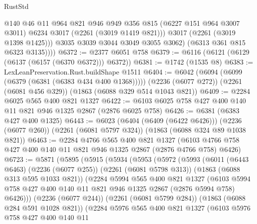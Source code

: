 \begin{lexlean}{RustStd}
\begin{coremodule}
                @140
                @46
                @11
                @964
                @821
                @946
                @949
                @356
                @815
                (@6227 @151 @964 @3007 @3011)
                @6234
                @3017
                (@2261 (@3019 @1419 @821)))
              @3017
              (@2261 (@3019 @1398 @1425)))
            @3035
            @3039
            @3044
            @3049
            @3055
            @3062)
          (@6313 @361 @815 @6323 @3135))))
@6372 := @2377 @6051 @758
@6379 := @6116 (@6121 (@6129 (@6137 (@6157 (@6370 @6372))) @6372))
@6381 := @1742 (@1535 @8)
@6383 := LexLeanPreservation.Rust.buildShape @1511
@6404 := @6042
    (@6094 (@6099 (@6379 (@6381 (@6383 @434 @400 @1368)))))
    (@2236 (@6077 @272))
    (@2261 (@6081 @456 @329))
    (@1863 (@6088 @329 @514 @1043 @821))
@6409 := @2284 @6025 @565 @400 @821 @1327
@6422 := @6103 @6025 @758 @427 @400 @140 @11 @821 @946 @1325 @2867 (@2876 @6025 @758)
@6426 := @6381 (@6383 @427 @400 @1325)
@6443 := @6023
    (@6404 (@6409 (@6422 @6426)))
    (@2236 (@6077 @260))
    (@2261 (@6081 @5797 @324))
    (@1863 (@6088 @324 @89 @1038 @821))
@6463 := @2284
    @4766
    @565
    @400
    @821
    @1327
    (@6103 @4766 @758 @427 @400 @140 @11 @821 @946 @1325 @2867 (@2876 @4766 @758) @6426)
@6723 := @5871
    (@5895
      (@5915
        (@5934
          (@5953
            (@5972
              (@5993
                (@6011
                  (@6443 @6463)
                  (@2236 (@6077 @255))
                  (@2261 (@6081 @5798 @313))
                  (@1863 (@6088 @313 @595 @1033 @821))
                  (@2284
                    @5994
                    @565
                    @400
                    @821
                    @1327
                    (@6103
                      @5994
                      @758
                      @427
                      @400
                      @140
                      @11
                      @821
                      @946
                      @1325
                      @2867
                      (@2876 @5994 @758)
                      @6426)))
                (@2236 (@6077 @244))
                (@2261 (@6081 @5799 @284))
                (@1863 (@6088 @284 @591 @1028 @821))
                (@2284
                  @5976
                  @565
                  @400
                  @821
                  @1327
                  (@6103
                    @5976
                    @758
                    @427
                    @400
                    @140
                    @11

\end{coremodule}
\end{lexlean}
